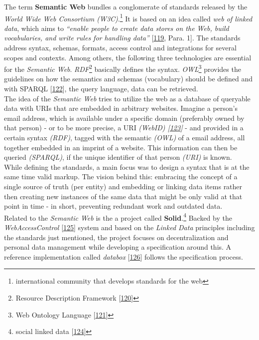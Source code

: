 \documentclass[12pt,english,a4paper,titlepage,cleardoublepage=empty,dottedtoc]{report}
\begin{document}
The term \textbf{\protect\hypertarget{def--semantic-web}{}{Semantic
Web}} bundles a conglomerate of standards released by the \emph{World
Wide Web Consortium (W3C)}.\footnote{international community that
  develops standards for the web} It is based on an idea called
\emph{web of linked data}, which aims to \emph{``enable people to create
data stores on the Web, build vocabularies, and write rules for handling
data''}
{[}\protect\hyperlink{ref-web_2016_w3c_semantic-web-activity}{119},
Para. 1{]}. The standards address syntax, schemas, formats, access
control and integrations for several scopes and contexts. Among others,
the following three technologies are essential for the \emph{Semantic
Web}. \emph{RDF}\footnote{Resource Description Framework
  {[}\protect\hyperlink{ref-web_w3c-tr_rdf}{120}{]}} basically defines
the syntax. \emph{OWL}\footnote{Web Ontology Language
  {[}\protect\hyperlink{ref-web_w3c-tr_owl}{121}{]}} provides the
guidelines on how the semantics and schemas (vocabulary) should be
defined and with \protect\hypertarget{def--sparql}{}{SPARQL}
{[}\protect\hyperlink{ref-web_w3c-tr_sparql}{122}{]}, the query
language, data can be retrieved.\\
The idea of the \emph{Semantic Web} tries to utilize the web as a
database of queryable data with URIs that are embedded in arbitrary
websites. Imagine a person's email address, which is available under a
specific domain (preferably owned by that person) - or to be more
precise, a URI \emph{(WebID)
{[}\protect\hyperlink{ref-web_w3c-draft_webid}{123}{]}} - and provided
in a certain syntax \emph{(RDF)}, tagged with the semantic \emph{(OWL)}
of a email address, all together embedded in an imprint of a website.
This information can then be queried \emph{(SPARQL)}, if the unique
identifier of that person \emph{(URI)} is known.\\
While defining the standards, a main focus was to design a syntax that
is at the same time valid markup. The vision behind this: embracing the
concept of a single source of truth (per entity) and embedding or
linking data items rather then creating new instances of the same data
that might be only valid at that point in time - in short, preventing
redundant work and outdated data.\\
Related to the \emph{Semantic Web} is the a project called
\textbf{Solid}.\footnote{social linked data
  {[}\protect\hyperlink{ref-web_spec_solid}{124}{]}} Backed by the
\emph{WebAccessControl}
{[}\protect\hyperlink{ref-web_2016_wiki_webaccesscontrol}{125}{]} system
and based on the \emph{Linked Data} principles including the standards
just mentioned, the project focuses on decentralization and personal
data management while developing a specification around this. A
reference implementation called \emph{databox}
{[}\protect\hyperlink{ref-web_2016_demo_databox}{126}{]} follows the
specification process.
\end{document}
